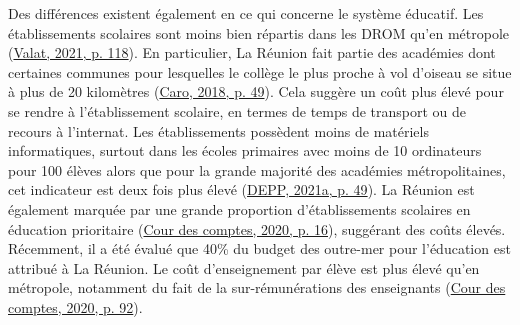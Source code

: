 \documentclass[
]{book}
\begin{document}
Des différences existent également en ce qui concerne le système éducatif. Les établissements scolaires sont moins bien répartis dans les DROM qu'en métropole (\protect\hyperlink{ref-VAL:21}{Valat, 2021, p. 118}). En particulier, La Réunion fait partie des académies dont certaines communes pour lesquelles le collège le plus proche à vol d'oiseau se situe à plus de 20 kilomètres (\protect\hyperlink{ref-CAR:18}{Caro, 2018, p. 49}). Cela suggère un coût plus élevé pour se rendre à l'établissement scolaire, en termes de temps de transport ou de recours à l'internat. Les établissements possèdent moins de matériels informatiques, surtout dans les écoles primaires avec moins de 10 ordinateurs pour 100 élèves alors que pour la grande majorité des académies métropolitaines, cet indicateur est deux fois plus élevé (\protect\hyperlink{ref-DEP:21GEO}{DEPP, 2021a, p. 49}). La Réunion est également marquée par une grande proportion d'établissements scolaires en éducation prioritaire (\protect\hyperlink{ref-COU:20}{Cour des comptes, 2020, p. 16}), suggérant des coûts élevés. Récemment, il a été évalué que 40\% du budget des outre-mer pour l'éducation est attribué à La Réunion. Le coût d'enseignement par élève est plus élevé qu'en métropole, notamment du fait de la sur-rémunérations des enseignants (\protect\hyperlink{ref-COU:20}{Cour des comptes, 2020, p. 92}).
\end{document}

